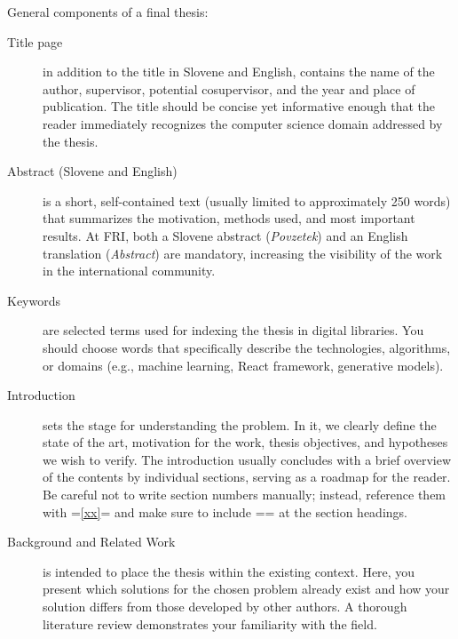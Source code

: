 \documentclass[9pt]{style/friteza}
\begin{document}
General components of a final thesis:
\begin{description}
    \item[Title page] in addition to the title in Slovene and English, contains the name of the author, supervisor, potential cosupervisor, and the year and place of publication. The title should be concise yet informative enough that the reader immediately recognizes the computer science domain addressed by the thesis.
    
    \item[Abstract (Slovene and English)] is a short, self-contained text (usually limited to approximately 250 words) that summarizes the motivation, methods used, and most important results. At FRI, both a Slovene abstract (\textit{Povzetek}) and an English translation (\textit{Abstract}) are mandatory, increasing the visibility of the work in the international community.
    
    \item[Keywords] are selected terms used for indexing the thesis in digital libraries. You should choose words that specifically describe the technologies, algorithms, or domains (e.g., machine learning, React framework, generative models).
    
    \item[Introduction] sets the stage for understanding the problem. In it, we clearly define the state of the art, motivation for the work, thesis objectives, and hypotheses we wish to verify. The introduction usually concludes with a brief overview of the contents by individual sections, serving as a roadmap for the reader. Be careful not to write section numbers manually; instead, reference them with \ltx=\ref{xx}= and make sure to include \ltx=\label{xx}= at the section headings.
    
    \item[Background and Related Work] is intended to place the thesis within the existing context. Here, you present which solutions for the chosen problem already exist and how your solution differs from those developed by other authors. A thorough literature review demonstrates your familiarity with the field.
    

\end{description}
\end{document}
